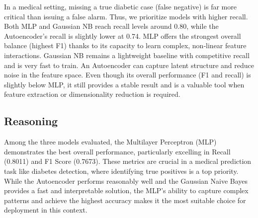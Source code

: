 In a medical setting, missing a true diabetic case (false negative) is far more critical than issuing a false alarm. Thus, we prioritize models with higher recall. Both MLP and Gaussian NB reach recall levels around 0.80, while the Autoencoder's recall is slightly lower at 0.74.
MLP offers the strongest overall balance (highest F1) thanks to its capacity to learn complex, non‐linear feature interactions. Gaussian NB remains a lightweight baseline with competitive recall and is very fast to train.
An Autoencoder can capture latent structure and reduce noise in the feature space. Even though its overall performance (F1 and recall) is slightly below MLP, it still provides a stable result and is a valuable tool when feature extraction or dimensionality reduction is required.


\subsection{Reasoning}
Among the three models evaluated, the Multilayer Perceptron (MLP) demonstrates the best overall performance, particularly excelling in Recall (0.8011) and F1 Score (0.7673). These metrics are crucial in a medical prediction task like diabetes detection, where identifying true positives is a top priority. While the Autoencoder performs reasonably well and the Gaussian Naive Bayes provides a fast and interpretable solution, the MLP's ability to capture complex patterns and achieve the highest accuracy makes it the most suitable choice for deployment in this context.

